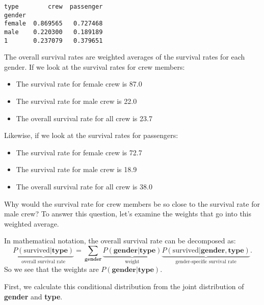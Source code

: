 \small\begin{verbatim}
type        crew  passenger
gender                     
female  0.869565   0.727468
male    0.220300   0.189189
1       0.237079   0.379651
\end{verbatim}



The overall survival rates are weighted averages of the survival rates for each gender. If we look at the survival rates for crew members:
\begin{itemize}
\item 
The survival rate for female crew is 87.0%

\item 
The survival rate for male crew is 22.0%

\item 
The overall survival rate for all crew is 23.7%

\end{itemize}

Likewise, if we look at the survival rates for passengers:
\begin{itemize}
\item 
The survival rate for female crew is 72.7%

\item 
The survival rate for male crew is 18.9%

\item 
The overall survival rate for all crew is 38.0%

\end{itemize}

Why would the survival rate for crew members be so close to the survival rate for male crew? To answer this question, let's examine the weights that go into this weighted average.



In mathematical notation, the overall survival rate can be decomposed as:
$$ \underbrace{P(\text{survived} | \textbf{type})}_{\text{overall survival rate}} = \sum_{\textbf{gender}} \underbrace{P(\textbf{gender} | \textbf{type})}_{\text{weight}} \underbrace{P(\text{survived} | \textbf{gender}, \textbf{type})}_{\text{gender-specific survival rate}}. $$
So we see that the weights are $P(\textbf{gender} | \textbf{type})$.

First, we calculate this conditional distribution from the joint distribution of \textbf{gender} and \textbf{type}.


